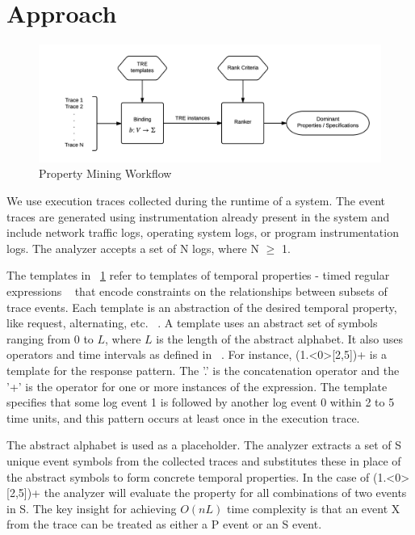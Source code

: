 \documentclass[]{sigplanconf}
\begin{document}
\section{Approach} \label{Approach}

\begin{figure}[h]
  \centering
  \includegraphics[trim = 1cm 0cm 0cm 0cm,clip = true,width=\linewidth]{figures/Workflow.png}
  \caption{Property Mining Workflow}
  \label{fig:work-flow Overview}
\end{figure}


We use execution traces collected during the runtime of a system. The event traces are generated using instrumentation already present in the system and include network traffic logs, operating system logs, or program instrumentation logs. The analyzer accepts a set of N logs, where N $\ge$ 1.

The templates in ~\ref{fig:work-flow Overview} refer to templates of temporal properties - timed regular expressions ~\cite{timedregex} that encode constraints on the relationships between subsets of trace events. Each template is an abstraction of the desired temporal property, like request, alternating, etc. ~\cite{evans1}. A template uses an abstract set of symbols ranging from $0$ to $L$, where $L$ is the length of the abstract alphabet. It also uses operators and time intervals as defined in ~\cite{timedregex}. For instance, (1.\textless0\textgreater[2,5])+ is a template for the response pattern. The '.' is the concatenation operator and the '+' is the operator for one or more instances of the expression.  The template specifies that some log event 1 is followed by another log event 0 within 2 to 5 time units, and this pattern occurs at least once in the execution trace.

The abstract alphabet is used as a placeholder. The analyzer extracts a set of S unique event symbols from the collected traces and substitutes these in place of the abstract symbols to form concrete temporal properties. In the case of (1.\textless0\textgreater[2,5])+ the analyzer will evaluate the property for all combinations of two events in S. The key insight for achieving $O(nL)$ time complexity is that an event X from the trace can be treated as either a P event or an S event.
\end{document}
